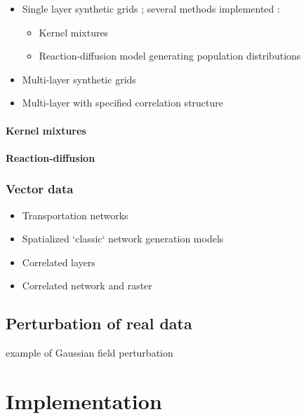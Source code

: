 \begin{itemize}
	\item Single layer synthetic grids ; several methods implemented :
		\begin{itemize}
			\item Kernel mixtures \cite{anas1998urban}
			\item Reaction-diffusion model generating population distributions \cite{raimbault2018calibration}
		\end{itemize}
	\item Multi-layer synthetic grids
	\item Multi-layer with specified correlation structure
\end{itemize}


\paragraph{Kernel mixtures}


\paragraph{Reaction-diffusion}





\subsubsection{Vector data}

\begin{itemize}
	\item Transportation networks
	\item Spatialized `classic` network generation models
	\item Correlated layers	
	\item Correlated network and raster 
\end{itemize}



\subsection{Perturbation of real data}

\cite{constantine2012method} example of Gaussian field perturbation







\section{Implementation}


